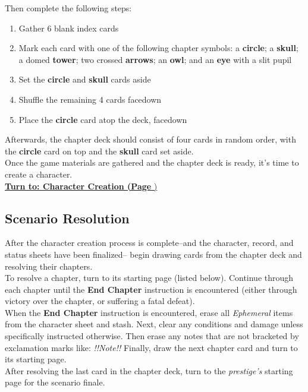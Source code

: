 \documentclass[12pt]{article}
\begin{document}
\begin{multicols*}{2}
Then complete the following steps:

\begin{enumerate}
\item Gather 6 blank index cards
\item Mark each card with one of the following chapter symbols: a \textbf{circle}; a \textbf{skull}; a domed \textbf{tower}; two crossed \textbf{arrows}; an \textbf{owl}; and an \textbf{eye} with a slit pupil 
\item Set the \textbf{circle} and \textbf{skull} cards aside
\item Shuffle the remaining 4 cards facedown
\item Place the \textbf{circle} card atop the deck, facedown
\end{enumerate}

Afterwards, the chapter deck should consist of four cards in random order, with the \textbf{circle} card on top and the \textbf{skull} card set aside.\\
Once the game materials are gathered and the chapter deck is ready, it’s time to create a character.\\

\hyperlink{chargen}{\textbf{Turn to: Character Creation (Page \pageref{chargen}})}

\subsection{Scenario Resolution}
\label{scenres}\hypertarget{scenres}{}
After the character creation process is complete--and the character, record, and status sheets have been finalized-- begin drawing cards from the chapter deck and resolving their chapters.\\
To resolve a chapter, turn to its starting page (listed below). Continue through each chapter until the \textbf{End Chapter} instruction is encountered (either through victory over the chapter, or suffering a fatal defeat).\\
When the \textbf{End Chapter} instruction is encountered, erase all \emph{Ephemeral} items from the character sheet and stash. Next, clear any conditions and damage unless specifically instructed otherwise. Then erase any notes that are not bracketed by exclamation marks like: \emph{!!Note!!} Finally, draw the next chapter card and turn to its starting page.\\
After resolving the last card in the chapter deck, turn to the \emph{prestige’s} starting page for the scenario finale.


\end{multicols*}
\end{document}
